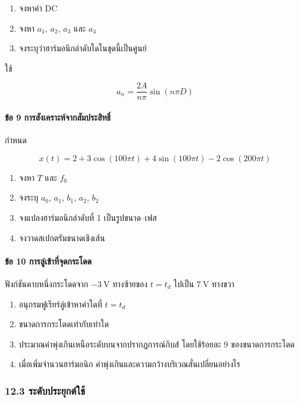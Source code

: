\begin{enumerate}
\def\labelenumi{\arabic{enumi}.}
\item
  จงหาค่า DC
\item
  จงหา \(a_1\), \(a_2\), \(a_3\) และ \(a_4\)
\item
  จงระบุว่าฮาร์มอนิกลำดับใดในชุดนี้เป็นศูนย์
\end{enumerate}

ใช้

\[
a_n=\frac{2A}{n\pi}\sin(n\pi D)
\]

\paragraph{ข้อ 9 การสังเคราะห์จากสัมประสิทธิ์}

กำหนด

\[
x(t)=2+3\cos(100\pi t)+4\sin(100\pi t)-2\cos(200\pi t)
\]

\begin{enumerate}
\def\labelenumi{\arabic{enumi}.}
\item
  จงหา \(T\) และ \(f_0\)
\item
  จงระบุ \(a_0\), \(a_1\), \(b_1\), \(a_2\), \(b_2\)
\item
  จงแปลงฮาร์มอนิกลำดับที่ 1 เป็นรูปขนาด--เฟส
\item
  จงวาดสเปกตรัมขนาดเชิงเส้น
\end{enumerate}

\paragraph{ข้อ 10 การลู่เข้าที่จุดกระโดด}

ฟังก์ชันคาบหนึ่งกระโดดจาก \(-3\ \text{V}\) ทางซ้ายของ \(t=t_d\) ไปเป็น \(7\ \text{V}\) ทางขวา

\begin{enumerate}
\def\labelenumi{\arabic{enumi}.}
\item
  อนุกรมฟูเรียร์ลู่เข้าหาค่าใดที่ \(t=t_d\)
\item
  ขนาดการกระโดดเท่ากับเท่าใด
\item
  ประมาณค่าพุ่งเกินเหนือระดับบนจากปรากฏการณ์กิบส์ โดยใช้ร้อยละ 9 ของขนาดการกระโดด
\item
  เมื่อเพิ่มจำนวนฮาร์มอนิก ค่าพุ่งเกินและความกว้างบริเวณสั่นเปลี่ยนอย่างไร
\end{enumerate}

\subsubsection{12.3 ระดับประยุกต์ใช้}

